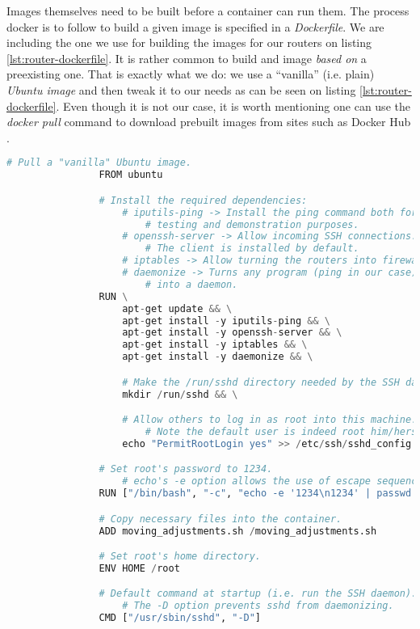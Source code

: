             Images themselves need to be built before a container can run them. The process docker is to follow to build a given image is specified in a \textit{Dockerfile}. We are including the one we use for building the images for our routers on listing \ref{lst:router-dockerfile}. It is rather common to build and image \textit{based on} a preexisting one. That is exactly what we do: we use a ``vanilla'' (i.e. plain) \textit{Ubuntu image} and then tweak it to our needs as can be seen on listing \ref{lst:router-dockerfile}. Even though it is not our case, it is worth mentioning one can use the \textit{docker pull} command to download prebuilt images from sites such as Docker Hub \cite{bib:docker-hub}.\\

            \begin{lstlisting}[language = python, caption = \textit{Dockerfile} for our Virtual Routers., label = lst:router-dockerfile]
                # Pull a "vanilla" Ubuntu image.
                FROM ubuntu

                # Install the required dependencies:
                    # iputils-ping -> Install the ping command both for
                        # testing and demonstration purposes.
                    # openssh-server -> Allow incoming SSH connections.
                        # The client is installed by default.
                    # iptables -> Allow turning the routers into firewalls.
                    # daemonize -> Turns any program (ping in our case)
                        # into a daemon.
                RUN \
                    apt-get update && \
                    apt-get install -y iputils-ping && \
                    apt-get install -y openssh-server && \
                    apt-get install -y iptables && \
                    apt-get install -y daemonize && \

                    # Make the /run/sshd directory needed by the SSH daemon.
                    mkdir /run/sshd && \

                    # Allow others to log in as root into this machine.
                        # Note the default user is indeed root him/herself.
                    echo "PermitRootLogin yes" >> /etc/ssh/sshd_config

                # Set root's password to 1234.
                    # echo's -e option allows the use of escape sequences (\n).
                RUN ["/bin/bash", "-c", "echo -e '1234\n1234' | passwd root"]

                # Copy necessary files into the container.
                ADD moving_adjustments.sh /moving_adjustments.sh

                # Set root's home directory.
                ENV HOME /root

                # Default command at startup (i.e. run the SSH daemon).
                    # The -D option prevents sshd from daemonizing.
                CMD ["/usr/sbin/sshd", "-D"]
            \end{lstlisting}


